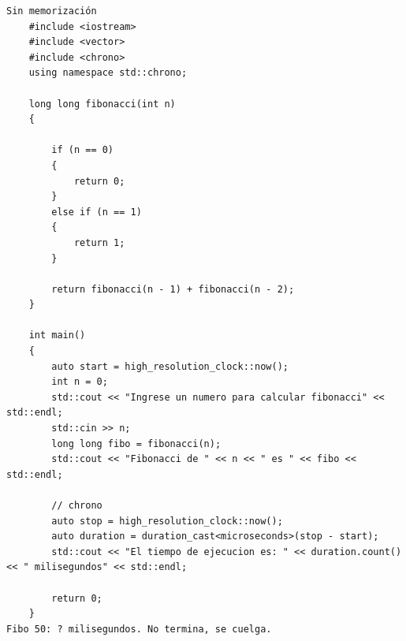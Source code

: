 \documentclass[10pt,a4paper]{article}
\begin{document}
\begin{lstlisting}
Sin memorización
    #include <iostream>
    #include <vector>
    #include <chrono>
    using namespace std::chrono;

    long long fibonacci(int n)
    {
        
        if (n == 0)
        {
            return 0;
        }
        else if (n == 1)
        {
            return 1;
        }
        
        return fibonacci(n - 1) + fibonacci(n - 2);
    }

    int main()
    {
        auto start = high_resolution_clock::now();
        int n = 0;
        std::cout << "Ingrese un numero para calcular fibonacci" << std::endl;
        std::cin >> n;
        long long fibo = fibonacci(n);
        std::cout << "Fibonacci de " << n << " es " << fibo << std::endl;

        // chrono
        auto stop = high_resolution_clock::now();
        auto duration = duration_cast<microseconds>(stop - start);
        std::cout << "El tiempo de ejecucion es: " << duration.count() << " milisegundos" << std::endl;

        return 0;
    }
Fibo 50: ? milisegundos. No termina, se cuelga.
\end{lstlisting}
\end{document}
